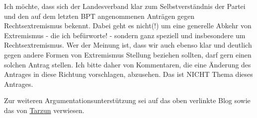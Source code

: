 Ich möchte, dass sich der Landesverband klar zum Selbstverständnis der Partei und den auf dem letzten BPT angenommenen Anträgen gegen Rechtsextremismus bekennt. Dabei geht es nicht(!) um eine generelle Abkehr von Extremismus - die ich befürworte! - sondern ganz speziell und insbesondere um Rechtsextremismus. Wer der Meinung ist, dass wir auch ebenso klar und deutlich gegen andere Formen von Extremismus Stellung beziehen sollten, darf gern einen solchen Antrag stellen. Ich bitte daher von Kommentaren, die eine Änderung des Antrages in diese Richtung vorschlagen, abzusehen. Das ist NICHT Thema dieses Antrages.

Zur weiteren Argumentationsunterstützung sei auf das oben verlinkte Blog sowie das von \href{http://tarzun.de/archives/423-Das-Problem-heisst-nicht-Kevin.html}{Tarzun} verwiesen. 
